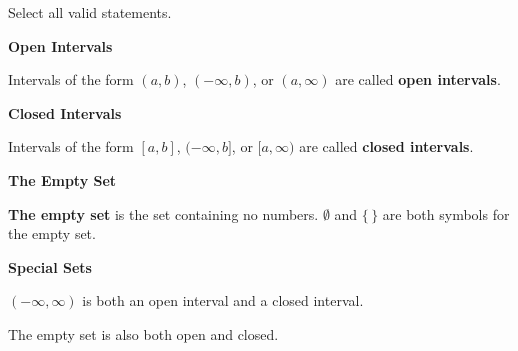 \documentclass{ximera}
\begin{document}
\begin{question} 


Select all valid statements.
    \begin{selectAll}
    \choice {$4 \in [-3, -5]$}
    \choice [correct]{$4 \in [1, 8)$}
    \choice [correct]{$5 \notin (-\infty, -4]$}
    \choice {$0 \notin [-\infty, 7)$}
    \choice [correct]{$0 \in (-1, 2]$}
    \choice {$0 \in [6, 2]$}
    \choice {$3 \notin [1, \infty]$}
    \choice [correct]{$-3 \notin [1, \infty)$}
    \end{selectAll}
\end{question}








\begin{definition} \textbf{\textcolor{green!50!black}{Open Intervals}}

Intervals of the form $(a, b)$, $(-\infty, b)$, or $(a, \infty)$ are called \textbf{open intervals}.

\end{definition}



\begin{definition} \textbf{\textcolor{green!50!black}{Closed Intervals}}

Intervals of the form $[a, b]$, $(-\infty, b]$, or $[a, \infty)$ are called \textbf{closed intervals}.

\end{definition}





\begin{definition} \textbf{\textcolor{green!50!black}{The Empty Set}}

\textbf{The empty set} is the set containing no numbers.  $\emptyset$ and $\{  \, \}$ are both symbols for the empty set.

\end{definition}



\begin{warning}  \textbf{\textcolor{red!70!black}{Special Sets}}

$(-\infty, \infty)$ is both an open interval and a closed interval.

The empty set is also both open and closed.

\end{warning}
\end{document}
